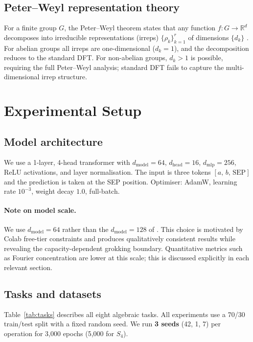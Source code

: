 \documentclass[11pt]{article}
\begin{document}
\subsection{Peter--Weyl representation theory}

For a finite group $G$, the Peter--Weyl theorem states that any function
$f: G \to \mathbb{R}^d$ decomposes into irreducible representations (irreps)
$\{\rho_k\}_{k=1}^r$ of dimensions $\{d_k\}$
\citep{diaconis1988group,serre1977linear}.
For abelian groups all irreps are one-dimensional ($d_k=1$), and the
decomposition reduces to the standard DFT.
For non-abelian groups, $d_k>1$ is possible, requiring the full
Peter--Weyl analysis; standard DFT fails to capture the multi-dimensional
irrep structure.

\section{Experimental Setup}
\label{sec:setup}

\subsection{Model architecture}

We use a 1-layer, 4-head transformer with $d_{\text{model}}=64$,
$d_{\text{head}}=16$, $d_{\text{mlp}}=256$, ReLU activations, and
layer normalisation. The input is three tokens $[a,\, b,\, \text{SEP}]$
and the prediction is taken at the SEP position.
Optimiser: AdamW, learning rate $10^{-3}$, weight decay $1.0$, full-batch.

\paragraph{Note on model scale.}
We use $d_{\text{model}}=64$ rather than the $d_{\text{model}}=128$ of
\citet{nanda2023progress}. This choice is motivated by Colab free-tier
constraints and produces qualitatively consistent results while revealing
the capacity-dependent grokking boundary. Quantitative metrics such as
Fourier concentration are lower at this scale; this is discussed explicitly
in each relevant section.

\subsection{Tasks and datasets}

Table~\ref{tab:tasks} describes all eight algebraic tasks.
All experiments use a 70/30 train/test split with a fixed random seed.
We run \textbf{3 seeds} (42, 1, 7) per operation for 3,000 epochs
(5,000 for $S_4$).
\end{document}
